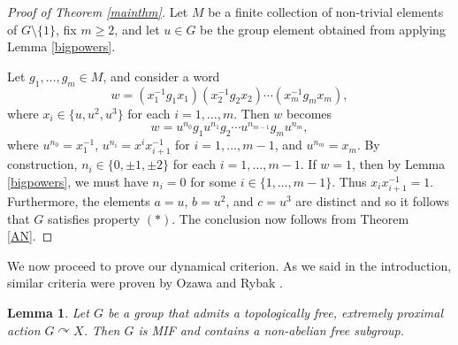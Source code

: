 \documentclass[11pt]{article}
\newtheorem{lem}[thm]{Lemma}
\theoremstyle{definition}
\theoremstyle{remark}
\numberwithin{equation}{section}
\numberwithin{equation}{section}
\numberwithin{equation}{section}
\begin{document}
\begin{proof}[Proof of Theorem \ref{mainthm}]
Let $M$ be a finite collection of non-trivial elements of $G\setminus\{1\}$, fix $m\geq2$, and let $u\in G$ be the group element obtained from applying Lemma \ref{bigpowers}.  

Let $g_1,\dots, g_m\in M$, and consider a word 
\[
w=(x_1^{-1}g_1x_1)(x_2^{-1}g_2x_2)\cdots (x_m^{-1}g_mx_m),
\]
where $x_i\in \{u,u^{2},u^{3}\}$ for each $i=1,\dots,m$. Then $w$ becomes
\[
w=u^{n_0}g_1u^{n_1}g_2\cdots u^{n_{m-1}}g_mu^{n_m},
\]
where $u^{n_0}=x_1^{-1}$, $u^{n_i}=x^ix_{i+1}^{-1}$ for $i=1,\dots, m-1$, and $u^{n_m}=x_m$.  By construction, $n_i\in \{0,\pm 1, \pm 2\}$ for each $i=1,\dots, m-1$.  If $w=1$, then by Lemma \ref{bigpowers}, we must have $n_i=0$ for some $i\in \{1,\dots, m-1\}$.  Thus $x_ix_{i+1}^{-1}=1$.  Furthermore, the elements $a=u$, $b=u^{2}$, and $c=u^{3}$ are distinct and so it follows that $G$ satisfies property $(*)$. The conclusion now follows from Theorem \ref{AN}. \end{proof}

We now proceed to prove our dynamical criterion. As we said in the introduction, similar criteria were proven by Ozawa \cite{Oz25} and Rybak \cite{Ry26}.

\begin{lem}\label{mainlemma}
Let $G$ be a group that admits a topologically free, extremely proximal action $G\curvearrowright X$. Then $G$ is MIF and contains a non-abelian free subgroup.
\end{lem}
\end{document}
